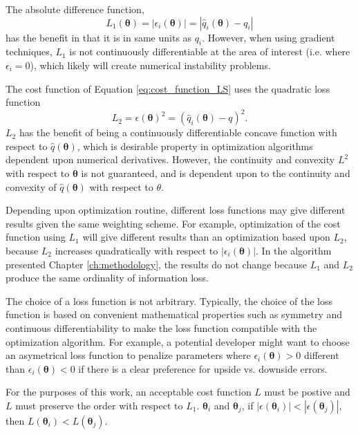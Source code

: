 The absolute difference function,
\begin{equation}
	\label{eq:L1_loss_function}
	L_1(\bm{\theta})
	= |\epsilon_i(\bm{\theta})|
	= |\hat{q}_i(\bm{\theta})-q_i|
\end{equation}
has the benefit in that it is in same units as $q_i$.  However, when using gradient techniques, $L_1$ is not continuously differentiable at the area of interest (i.e. where $\epsilon_i =0$), which likely will create numerical instability problems.

The cost function of Equation \ref{eq:cost_function_LS} uses the quadratic loss function
\begin{equation}
	\label{eq:L2_loss_function}
  L_2
	=\epsilon(\bm{\theta})^2
	=(\hat{q}_i(\bm{\theta})-q)^2.
\end{equation}
$L_2$ has the benefit of being a continuously differentiable concave function with respect to $\hat{q}(\bm{\theta})$, which is desirable property in optimization algorithms dependent upon numerical derivatives.  However, the continuity and convexity $L^2$ with respect to $\bm{\theta}$ is not guaranteed, and is dependent upon to the continuity and convexity of $\hat{q}(\bm{\theta})$ with respect to $\theta$.

Depending upon optimization routine, different loss functions may give different results given the same weighting scheme.  For example, optimization of the cost function using $L_1$ will give different results than an optimization based upon $L_2$, because $L_2$ increases quadratically with respect to $|\epsilon_i(\bm{\theta})|$.  In the algorithm presented Chapter \ref{ch:methodology}, the results do not change because $L_1$ and $L_2$ produce the same ordinality of information loss.

The choice of a loss function is not arbitrary.  Typically, the choice of the loss function is based on convenient mathematical properties such as symmetry and continuous differentiability to make the loss function compatible with the optimization algorithm.  For example, a potential developer might want to choose an asymetrical loss function to penalize parameters where $\epsilon_i(\bm{\theta}) > 0$ different than $\epsilon_i(\bm{\theta}) < 0$ if there is a clear preference for upside vs. downside errors.

For the purposes of this work, an acceptable cost function $L$ must be postive and $L$ must preserve the order with respect to $L_1$.   $\bm{\theta}_i$ and $\bm{\theta}_j$, if $|\epsilon(\bm{\theta}_i)| < |\epsilon(\bm{\theta}_j)|$, then $L(\bm{\theta}_i) < L(\bm{\theta}_j)$.

